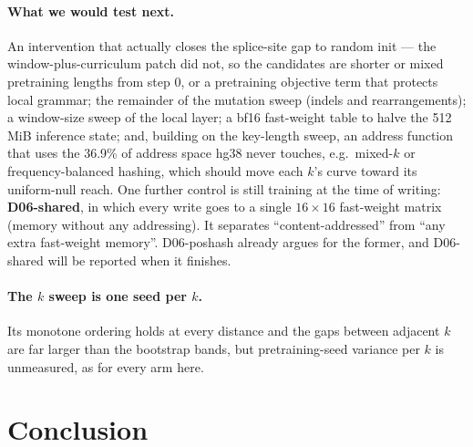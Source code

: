 \documentclass[11pt]{article}
\theoremstyle{plain}
\begin{document}
\paragraph{What we would test next.} An intervention that actually closes the splice-site gap to
random init --- the window-plus-curriculum patch did not, so the candidates are shorter or mixed
pretraining lengths from step 0, or a pretraining objective term that protects local grammar;
the remainder of the mutation
sweep (indels and rearrangements); a window-size sweep of the local layer; a bf16 fast-weight table to halve
the 512\,MiB inference state; and, building on the key-length sweep, an address function that
uses the 36.9\% of address space hg38 never touches, e.g.\ mixed-$k$ or frequency-balanced
hashing, which should move each $k$'s curve toward its uniform-null reach. One further control
is still training at the time of writing: \textbf{D06-shared}, in which every write goes to a
single $16\times16$ fast-weight matrix (memory without any addressing). It separates
``content-addressed'' from ``any extra fast-weight memory''. D06-poshash already argues for the
former, and D06-shared will be reported when it finishes.

\paragraph{The $k$ sweep is one seed per $k$.} Its monotone ordering holds at every distance and
the gaps between adjacent $k$ are far larger than the bootstrap bands, but pretraining-seed
variance per $k$ is unmeasured, as for every arm here.

\section{Conclusion}\label{sec:conc}
\end{document}
